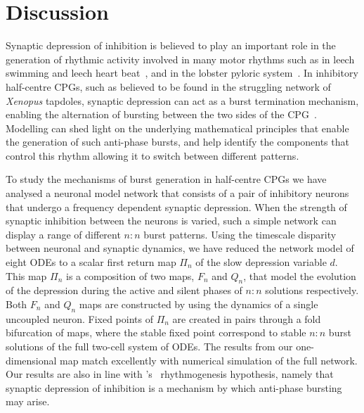 \section{Discussion}
Synaptic depression of inhibition is believed to play an important role in the generation of rhythmic activity involved in many motor rhythms such as in leech swimming \citep{mangan1994} and leech heart beat~\citep{calabrese1995}, and in the lobster pyloric system~\citep{manor1997, rabbah2007}.
In inhibitory half-centre CPGs, such as believed to be found in the struggling network of \textit{Xenopus} tapdoles,  synaptic depression can act as a burst termination mechanism, enabling the alternation of bursting between the two sides of the CPG~\citep{li2007}.
Modelling can shed light on the underlying mathematical principles that enable the generation of such anti-phase bursts, and help identify the components that control this rhythm allowing it to switch between different patterns.

To study the mechanisms of burst generation in half-centre CPGs we have analysed a neuronal model network that consists of a pair of inhibitory neurons that undergo a frequency dependent synaptic depression.
When the strength of synaptic inhibition between the neurons is varied, such a simple network can display a range of different $n:n$ burst patterns.
Using the timescale disparity between neuronal and synaptic dynamics, we have reduced the network model of eight ODEs to a scalar first return map $\Pi_n$ of the slow depression variable $d$.
This map $\Pi_n$ is a composition of two maps, $F_n$ and $Q_n$, that model the evolution of the depression during the active and silent phases of $n:n$ solutions respectively.
Both $F_n$ and $Q_n$ maps are constructed by using the dynamics of a single uncoupled neuron.
Fixed points of $\Pi_n$ are created in pairs through a fold bifurcation of maps, where the stable fixed point correspond to stable $n:n$ burst solutions of the full two-cell system of ODEs.
The results from our one-dimensional map match excellently with numerical simulation of the full network.
Our results are also in line with \citeauthor{brown1911}'s~\citeyear{brown1911} rhythmogenesis hypothesis, namely that synaptic depression of inhibition is a mechanism by which anti-phase bursting may arise.

